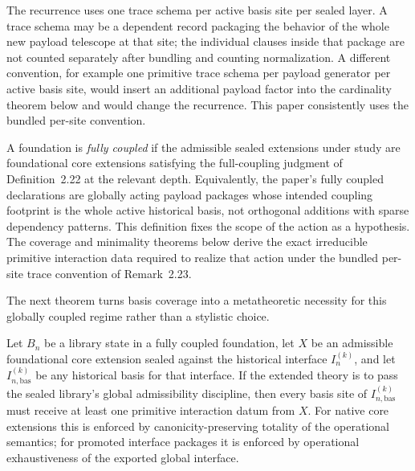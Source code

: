 \begin{remark}
The recurrence uses one trace schema per active basis site per sealed layer.  A trace schema
may be a dependent record packaging the behavior of the whole new payload telescope at that
site; the individual clauses inside that package are not counted separately after bundling and
counting normalization.  A different convention, for example one primitive trace schema per
payload generator per active basis site, would insert an additional payload factor into the
cardinality theorem below and would change the recurrence.  This paper consistently uses the
bundled per-site convention.
\end{remark}

\begin{definition}
A foundation is \emph{fully coupled} if the admissible sealed extensions under study are
foundational core extensions satisfying the full-coupling judgment of Definition~2.22 at the
relevant depth.  Equivalently, the paper's fully coupled declarations are globally acting
payload packages whose intended coupling footprint is the whole active historical basis, not
orthogonal additions with sparse dependency patterns.  This definition fixes the scope of the
action as a hypothesis.  The coverage and minimality theorems below derive the exact
irreducible primitive interaction data required to realize that action under the bundled
per-site trace convention of Remark~2.23.
\end{definition}

The next theorem turns basis coverage into a metatheoretic necessity for this globally coupled
regime rather than a stylistic choice.

\begin{theorem}
Let \(B_n\) be a library state in a fully coupled foundation, let \(X\) be an admissible
foundational core extension sealed against the historical interface \(I_n^{(k)}\), and let
\(I_{n,\mathrm{bas}}^{(k)}\) be any historical basis for that interface.  If the extended theory is
to pass the sealed library's global admissibility discipline, then every basis site of
\(I_{n,\mathrm{bas}}^{(k)}\) must receive at least one primitive interaction datum from \(X\).  For
native core extensions this is enforced by canonicity-preserving totality of the operational
semantics; for promoted interface packages it is enforced by operational exhaustiveness of
the exported global interface.
\end{theorem}

